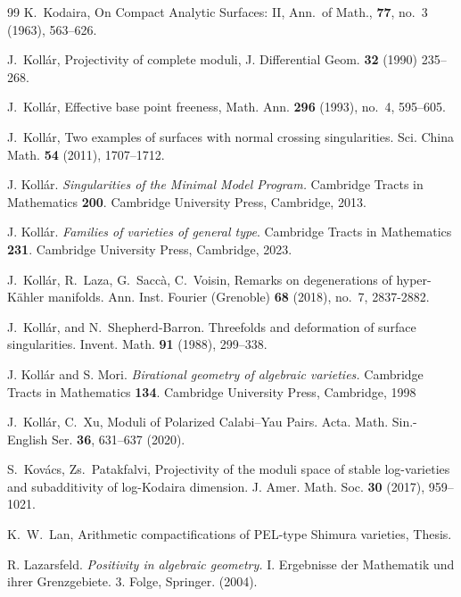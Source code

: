 \documentclass[12pt,twoside]{amsart}
\theoremstyle{definition}
\begin{document}
\begin{thebibliography}{99}
 K.~Kodaira, On Compact Analytic Surfaces: II, Ann.~of Math., {\bf77}, no.~3 (1963), 563--626.

 J.~Koll\'ar, Projectivity of complete moduli, J. Differential Geom. {\textbf{32}} (1990) 235--268.

 J.~Koll\'ar, Effective base point freeness, Math. Ann. {\textbf{296}} (1993), no.~4, 595--605.



 J.~Koll\'ar, Two examples of surfaces with normal crossing singularities. Sci. China Math. {\bf54} (2011), 1707--1712.

 J. Koll\'{a}r. {\it Singularities of the Minimal Model Program.} Cambridge Tracts in Mathematics {\bf 200}. Cambridge University Press, Cambridge, 2013.

 J. Koll\'{a}r. {\it Families of varieties of general type}. Cambridge Tracts in Mathematics {\bf 231}. Cambridge University Press, Cambridge, 2023.

 J.~Koll\'{a}r, R.~Laza, G.~Sacc\`{a}, C.~Voisin, Remarks on degenerations of hyper-K\"{a}hler manifolds. Ann. Inst. Fourier (Grenoble) {\bf 68} (2018), no.~7, 2837-2882.



 J.~Koll\'{a}r, and N.~Shepherd-Barron. Threefolds and deformation of surface singularities. Invent. Math. {\bf91} (1988), 299--338.

 J. Koll\'{a}r and S. Mori. {\it Birational geometry of algebraic varieties.} Cambridge Tracts in Mathematics {\bf 134}. Cambridge University Press, Cambridge, 1998

 J.~Koll\'ar,  C.~Xu, Moduli of Polarized Calabi--Yau Pairs. Acta. Math. Sin.-English Ser. {\bf36}, 631--637 (2020).






 S.~Kov\'acs, Zs.~Patakfalvi, Projectivity of the moduli space of stable log-varieties and subadditivity of log-Kodaira dimension. J. Amer. Math. Soc. {\bf30} (2017), 959--1021.

 K.~W.~Lan, Arithmetic compactifications of PEL-type Shimura varieties, Thesis.

 R. Lazarsfeld. {\it Positivity in algebraic geometry.} I. Ergebnisse der Mathematik und ihrer Grenzgebiete. 3. Folge, Springer. (2004).




\end{thebibliography}
\end{document}
